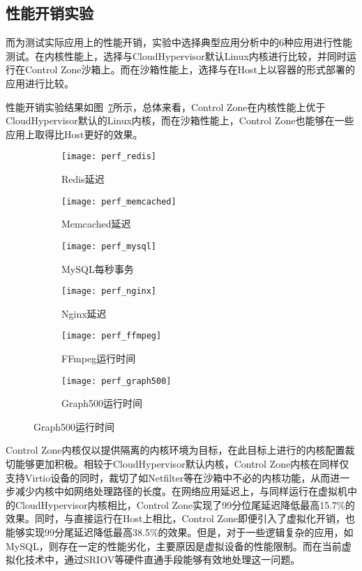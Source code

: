 \subsection{性能开销实验}

而为测试实际应用上的性能开销，实验中选择典型应用分析中的6种应用进行性能测试。在内核性能上，选择与CloudHypervisor默认Linux内核进行比较，并同时运行在Control Zone沙箱上。而在沙箱性能上，选择与在Host上以容器的形式部署的应用进行比较。

性能开销实验结果如图~\ref{fig:perf_app}所示，总体来看，Control Zone在内核性能上优于CloudHypervisor默认的Linux内核，而在沙箱性能上，Control Zone也能够在一些应用上取得比Host更好的效果。

\begin{figure}[!htbp]
    \centering
    \begin{subfigure}[b]{0.32\textwidth}
        \texttt{[image: perf\_redis]}
        \caption{\quad Redis延迟}
        \label{fig:perf_redis}
    \end{subfigure}
    \begin{subfigure}[b]{0.32\textwidth}
        \texttt{[image: perf\_memcached]}
        \caption{\quad Memcached延迟}
        \label{fig:perf_memcached}
    \end{subfigure}
    \begin{subfigure}[b]{0.32\textwidth}
        \texttt{[image: perf\_mysql]}
        \caption{\quad MySQL每秒事务}
        \label{fig:perf_mysql}
    \end{subfigure}
    \begin{subfigure}[b]{0.32\textwidth}
        \texttt{[image: perf\_nginx]}
        \caption{\quad Nginx延迟}
        \label{fig:perf_nginx}
    \end{subfigure}
    \begin{subfigure}[b]{0.32\textwidth}
        \texttt{[image: perf\_ffmpeg]}
        \caption{\quad FFmpeg运行时间}
        \label{fig:perf_ffmpeg}
    \end{subfigure}
    \begin{subfigure}[b]{0.32\textwidth}
        \texttt{[image: perf\_graph500]}
        \caption{\quad Graph500运行时间}
        \label{fig:perf_graph500}
    \end{subfigure}
\label{fig:perf_app}
\end{figure}

Control Zone内核仅以提供隔离的内核环境为目标，在此目标上进行的内核配置裁切能够更加积极。相较于CloudHypervisor默认内核，Control Zone内核在同样仅支持Virtio设备的同时，裁切了如Netfilter等在沙箱中不必的内核功能，从而进一步减少内核中如网络处理路径的长度。在网络应用延迟上，与同样运行在虚拟机中的CloudHypervisor内核相比，Control Zone实现了99分位尾延迟降低最高15.7\%的效果。同时，与直接运行在Host上相比，Control Zone即便引入了虚拟化开销，也能够实现99分尾延迟降低最高38.5\%的效果。但是，对于一些逻辑复杂的应用，如MySQL，则存在一定的性能劣化，主要原因是虚拟设备的性能限制。而在当前虚拟化技术中，通过SRIOV等硬件直通手段能够有效地处理这一问题。

